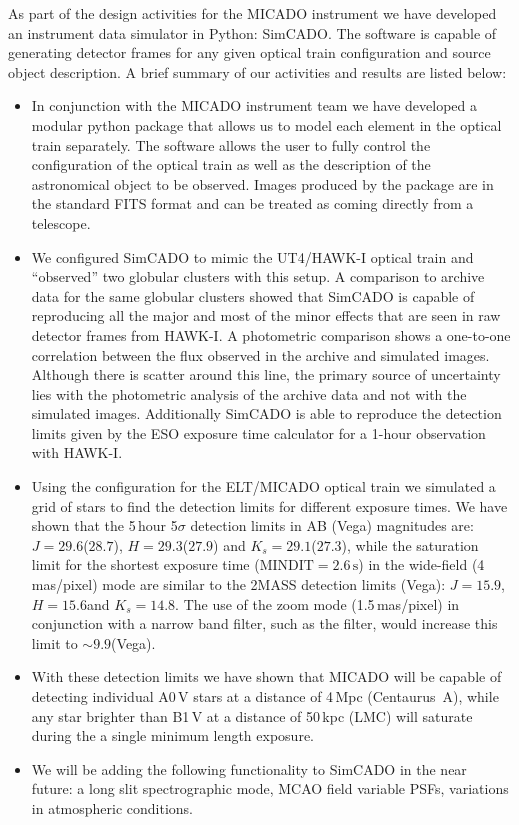 As part of the design activities for the MICADO instrument we have developed an instrument data simulator in Python: SimCADO.
The software is capable of generating detector frames for any given optical train configuration and source object description.
A brief summary of our activities and results are listed below:

\begin{itemize}

    \item In conjunction with the MICADO instrument team we have developed a modular python package that allows us to model each element in the optical train separately.
    The software allows the user to fully control the configuration of the optical train as well as the description of the astronomical object to be observed.
    Images produced by the package are in the standard FITS format and can be treated as coming directly from a telescope.
    
    \item We configured SimCADO to mimic the UT4/HAWK-I optical train and ``observed'' two globular clusters with this setup.
    A comparison to archive data for the same globular clusters showed that SimCADO is capable of reproducing all the major and most of the minor effects that are seen in raw detector frames from HAWK-I.
    A photometric comparison shows a one-to-one correlation between the flux observed in the archive and simulated images.
    Although there is scatter around this line, the primary source of uncertainty lies with the photometric analysis of the archive data and not with the simulated images.
    Additionally SimCADO is able to reproduce the detection limits given by the ESO exposure time calculator for a 1-hour observation with HAWK-I.
    
    \item Using the configuration for the ELT/MICADO optical train we simulated a grid of stars to find the detection limits for different exposure times.
    We have shown that the 5\,hour 5$\sigma$ detection limits in AB (Vega) magnitudes are: $J=29.6$\m ($28.7$\m), $H=29.3$\m ($27.9$\m) and $K_{s}=29.1$\m ($27.3$\m), while the saturation limit for the shortest exposure time ($\mathrm{MINDIT}=2.6\,\mathrm{s}$) in the wide-field (4\,mas/pixel) mode are similar to the 2MASS detection limits (Vega): $J=15.9$\m, $H=15.6$\m and $K_{s}=14.8$\m.
    The use of the zoom mode (1.5\,mas/pixel) in conjunction with a narrow band filter, such as the \brgamma filter, would increase this limit to $\sim 9.9$\m (Vega).

    \item With these detection limits we have shown that MICADO will be capable of detecting individual A0\,V stars at a distance of 4\,Mpc (Centaurus~A), while any star brighter than B1\,V at a distance of 50\,kpc (LMC) will saturate during the a single minimum length exposure.
    
    \item We will be adding the following functionality to SimCADO in the near future: a long slit spectrographic mode, MCAO field variable PSFs, variations in atmospheric conditions.

\end{itemize}

